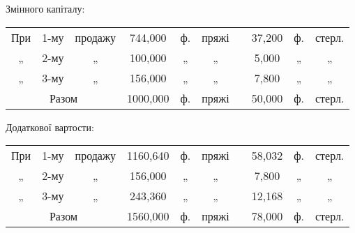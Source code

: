 Змінного капіталу:

\begin{table}[h]
  \setlength{\tabcolsep}{2pt}
  \begin{tabularx}{\textwidth}{c c c c c c c c c c}
    При & 1-му & продажу & 744,000 & ф. & пряжі & \deq{} & 37,200 & ф. & стерл.\\
    „ & 2-му & „ & 100,000 & „ & „ & \deq{} & 5,000 & „ & „\\
    „ & 3-му & „ & 156,000 & „ & „ & \deq{} & 7,800 & „ & „\\
    \cmidrule{1-10}

  \multicolumn{3}{c}{Разом} & 1000,000 & ф. & пряжі & \deq{} & 50,000 & ф. & стерл.\\
\end{tabularx}
\end{table}

Додаткової вартости:

\begin{table}[h]
  \setlength{\tabcolsep}{2pt}
  \begin{tabularx}{\textwidth}{c c c c c c c c c c}
    При & 1-му & продажу & 1160,640 & ф. & пряжі & \deq{} & 58,032 & ф. & стерл.\\
    „ & 2-му & „ & 156,000 & „ & „ & \deq{} & 7,800 & „ & „\\
    „ & 3-му & „ & 243,360 & „ & „ & \deq{} & 12,168 & „ & „\\
    \cmidrule{1-10}
    \multicolumn{3}{c}{Разом} & 1560,000 & ф. & пряжі & \deq{} & 78,000 & ф. & стерл.\\
  \end{tabularx}
\end{table}
\parbreak{}  %
